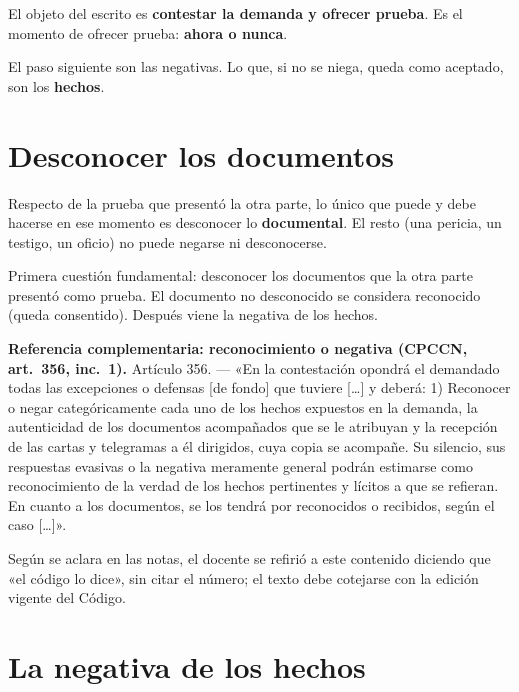 \documentclass[12pt,oneside]{book}
\begin{document}
El objeto del escrito es \textbf{contestar la demanda y ofrecer prueba}. Es el momento de ofrecer prueba: \textbf{ahora o nunca}.

El paso siguiente son las negativas. Lo que, si no se niega, queda como aceptado, son los \textbf{hechos}.

\section{Desconocer los documentos}

Respecto de la prueba que presentó la otra parte, lo único que puede y debe hacerse en ese momento es desconocer lo \textbf{documental}. El resto (una pericia, un testigo, un oficio) no puede negarse ni desconocerse.

\begin{important}
Primera cuestión fundamental: desconocer los documentos que la otra parte presentó como prueba. El documento no desconocido se considera reconocido (queda consentido). Después viene la negativa de los hechos.
\end{important}

\begin{note}
\textbf{Referencia complementaria: reconocimiento o negativa (CPCCN, art.~356, inc.~1).}
Artículo 356. --- «En la contestación opondrá el demandado todas las excepciones o defensas [de fondo] que tuviere [\ldots] y deberá: 1) Reconocer o negar categóricamente cada uno de los hechos expuestos en la demanda, la autenticidad de los documentos acompañados que se le atribuyan y la recepción de las cartas y telegramas a él dirigidos, cuya copia se acompañe. Su silencio, sus respuestas evasivas o la negativa meramente general podrán estimarse como reconocimiento de la verdad de los hechos pertinentes y lícitos a que se refieran. En cuanto a los documentos, se los tendrá por reconocidos o recibidos, según el caso [\ldots]».

Según se aclara en las notas, el docente se refirió a este contenido diciendo que «el código lo dice», sin citar el número; el texto debe cotejarse con la edición vigente del Código.
\end{note}

\section{La negativa de los hechos}
\end{document}
